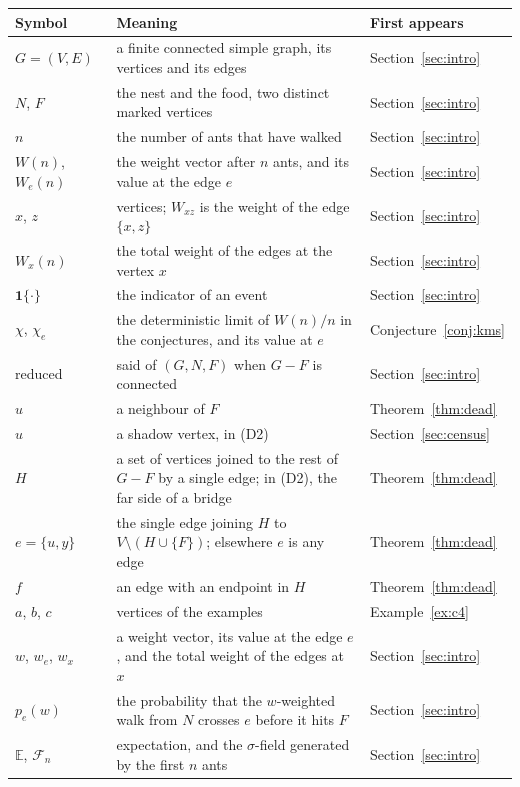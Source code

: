 \documentclass[11pt]{amsart}
\theoremstyle{remark}
\newcommand{\EE}{\mathbb{E}}
\newcommand{\cF}{\mathcal{F}}
\newcommand{\one}{\mathbf{1}}
\begin{document}
\begin{longtable}{@{}>{\raggedright\arraybackslash}p{}>{\raggedright\arraybackslash}p{}>{\raggedright\arraybackslash}p{}@{}}
\toprule
Symbol & Meaning & First appears \\
\midrule
\endhead
$G=(V,E)$ & a finite connected simple graph, its vertices and its edges & Section~\ref{sec:intro} \\
$N$, $F$ & the nest and the food, two distinct marked vertices & Section~\ref{sec:intro} \\
$n$ & the number of ants that have walked & Section~\ref{sec:intro} \\
$W(n)$, $W_e(n)$ & the weight vector after $n$ ants, and its value at the edge $e$ & Section~\ref{sec:intro} \\
$x$, $z$ & vertices; $W_{xz}$ is the weight of the edge $\{x,z\}$ & Section~\ref{sec:intro} \\
$W_x(n)$ & the total weight of the edges at the vertex $x$ & Section~\ref{sec:intro} \\
$\one\{\cdot\}$ & the indicator of an event & Section~\ref{sec:intro} \\
$\chi$, $\chi_e$ & the deterministic limit of $W(n)/n$ in the conjectures, and its value at $e$ & Conjecture~\ref{conj:kms} \\
reduced & said of $(G,N,F)$ when $G-F$ is connected & Section~\ref{sec:intro} \\
$u$ & a neighbour of $F$ & Theorem~\ref{thm:dead} \\
$u$ & a shadow vertex, in (D2) & Section~\ref{sec:census} \\
$H$ & a set of vertices joined to the rest of $G-F$ by a single edge; in (D2), the far side of a bridge & Theorem~\ref{thm:dead} \\
$e=\{u,y\}$ & the single edge joining $H$ to $V\setminus(H\cup\{F\})$; elsewhere $e$ is any edge & Theorem~\ref{thm:dead} \\
$f$ & an edge with an endpoint in $H$ & Theorem~\ref{thm:dead} \\
$a$, $b$, $c$ & vertices of the examples & Example~\ref{ex:c4} \\
$w$, $w_e$, $w_x$ & a weight vector, its value at the edge $e$, and the total weight of the edges at $x$ & Section~\ref{sec:intro} \\
$p_e(w)$ & the probability that the $w$-weighted walk from $N$ crosses $e$ before it hits $F$ & Section~\ref{sec:intro} \\
$\EE$, $\cF_n$ & expectation, and the $\sigma$-field generated by the first $n$ ants & Section~\ref{sec:intro} \\

\end{longtable}
\end{document}
